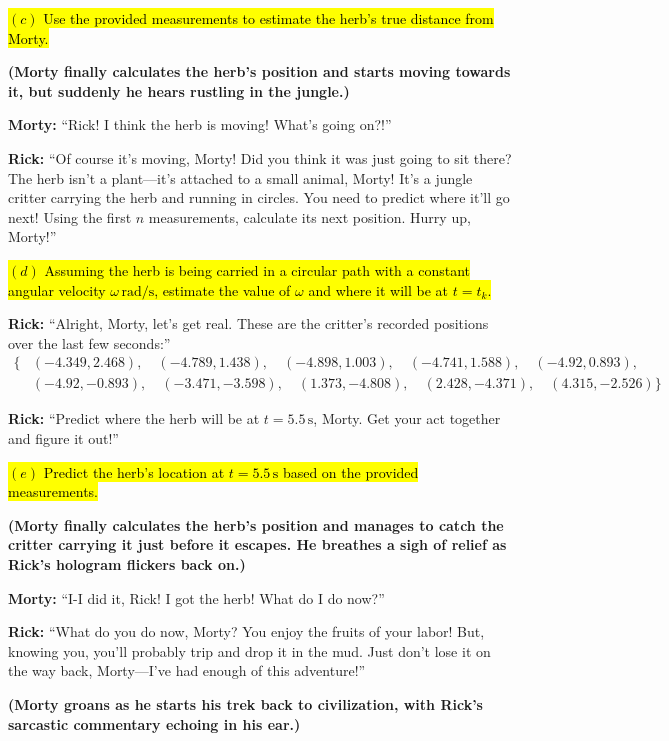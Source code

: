 \documentclass[a4paper, 12pt]{exam}
\begin{document}
\bigskip

\hl{$(c)$ Use the provided measurements to estimate the herb's true distance from Morty.}
\bigskip

\noindent \textbf{(Morty finally calculates the herb’s position and starts moving towards it, but suddenly he hears rustling in the jungle.)}

\bigskip
\noindent \textbf{Morty:} “Rick! I think the herb is moving! What’s going on?!” \bigskip

\noindent \textbf{Rick:} “Of course it’s moving, Morty! Did you think it was just going to sit there? The herb isn’t a plant—it’s attached to a small animal, Morty! It’s a jungle critter carrying the herb and running in circles. You need to predict where it’ll go next! Using the first \(n\) measurements, calculate its next position. Hurry up, Morty!”

\bigskip

\hl{$(d)$ Assuming the herb is being carried in a circular path with a constant angular velocity $\omega \, \mathrm{rad/s}$, estimate the value of $\omega$ and where it will be at $t = t_k$.}

\bigskip
\noindent \textbf{Rick:} “Alright, Morty, let’s get real. These are the critter’s recorded positions over the last few seconds:”
\begin{align*}
\{
&(-4.349, 2.468), \quad (-4.789, 1.438), \quad (-4.898, 1.003), \quad (-4.741, 1.588), \quad (-4.92, 0.893), \\
&(-4.92, -0.893), \quad (-3.471, -3.598), \quad (1.373, -4.808), \quad (2.428, -4.371), \quad (4.315, -2.526)
\}
\end{align*}

\noindent \textbf{Rick:} “Predict where the herb will be at \(t = 5.5 \, \mathrm{s}\), Morty. Get your act together and figure it out!”

\bigskip

\hl{$(e)$ Predict the herb's location at $t = 5.5 \, \mathrm{s}$ based on the provided measurements.}
\bigskip

\noindent \textbf{(Morty finally calculates the herb’s position and manages to catch the critter carrying it just before it escapes. He breathes a sigh of relief as Rick’s hologram flickers back on.)}

\bigskip
\noindent \textbf{Morty:} “I-I did it, Rick! I got the herb! What do I do now?” \bigskip

\noindent \textbf{Rick:} “What do you do now, Morty? You enjoy the fruits of your labor! But, knowing you, you’ll probably trip and drop it in the mud. Just don’t lose it on the way back, Morty—I’ve had enough of this adventure!”

\bigskip

\noindent \textbf{(Morty groans as he starts his trek back to civilization, with Rick’s sarcastic commentary echoing in his ear.)}
\end{document}
